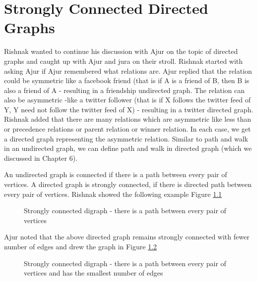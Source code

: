 \chapter{Strongly Connected Directed Graphs}
Rishnak wanted to continue his discussion with Ajur on the topic of directed graphs and caught up with Ajur and jura on their stroll. Rishnak started with asking Ajur if Ajur remembered what relations are. Ajur replied that the relation could be symmetric like a facebook friend (that is if A is a friend of B, then B is also a friend of A - resulting in a friendship
undirected graph.
The relation can also be asymmetric -like a twitter follower (that is if X follows the twitter
feed of Y, Y need not follow the twitter feed of X) - resulting in a twitter directed graph.
Rishnak added that there are many relations which are asymmetric like less than or precedence relations or parent relation or winner relation. In each case, we get a directed graph representing the asymmetric relation.
Similar to path and walk in an undirected graph, we can define path and walk in directed graph (which we discussed in Chapter 6).

An undirected graph is connected if there is a path between every pair of vertices. A directed graph is strongly connected, if there is directed path between every pair of vertices. Rishnak showed the following example Figure \ref{15g1}

\begin{figure}
\begin{center}
\caption{ Strongly connected digraph - there is a path between every pair of vertices}\label{15g1}
\end{center}
\end{figure}

Ajur noted that the above directed graph remains strongly connected with fewer number of edges and  drew the graph in Figure \ref{15g2}

\begin{figure}
\begin{center}
\caption{ Strongly connected digraph - there is a path between every pair of vertices and has the smallest number of edges}\label{15g2}
\end{center}
\end{figure}

